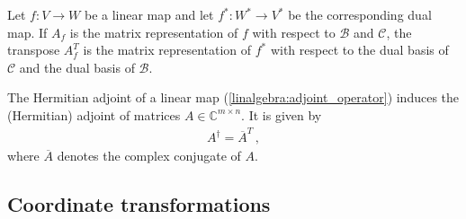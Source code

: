     \begin{property}[Transpose]
        Let $f:V\rightarrow W$ be a linear map and let $f^*:W^*\rightarrow V^*$ be the corresponding dual map. If $A_f$ is the matrix representation of $f$ with respect to $\mathcal{B}$ and $\mathcal{C}$, the transpose $A_f^T$ is the matrix representation of $f^*$ with respect to the dual basis of $\mathcal{C}$ and the dual basis of $\mathcal{B}$.
    \end{property}
    \begin{result}
        The Hermitian adjoint of a linear map (\cref{linalgebra:adjoint_operator}) induces the (Hermitian) adjoint of matrices $A\in\mathbb{C}^{m\times n}$. It is given by
        \begin{gather}
            A^\dag = \overline{A}^T\,,
        \end{gather}
        where $\overline{A}$ denotes the complex conjugate of $A$.
    \end{result}

\subsection{Coordinate transformations}


